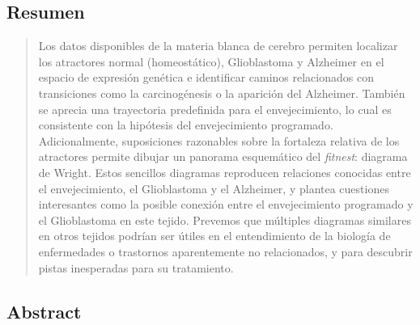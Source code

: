 \vfill

\begin{center}
\section*{Resumen}
\end{center}
\medskip

\begin{minipage}[c]{.9\linewidth}
\begin{quote}
	
{\large Los datos disponibles de la materia blanca de cerebro permiten localizar los atractores normal (homeostático), Glioblastoma y Alzheimer en el espacio de expresión genética e identificar caminos relacionados con transiciones como la carcinogénesis o la aparición del Alzheimer. También se aprecia una trayectoria predefinida para el envejecimiento, lo cual es consistente con la hipótesis del envejecimiento programado. Adicionalmente, suposiciones razonables sobre la fortaleza relativa de los atractores permite dibujar un panorama esquemático del \textit{fitnest}: diagrama de Wright. Estos sencillos diagramas reproducen relaciones conocidas entre el envejecimiento, el Glioblastoma y el Alzheimer, y plantea cuestiones interesantes como la posible conexión entre el envejecimiento programado y el Glioblastoma en este tejido. Prevemos que múltiples diagramas similares en otros tejidos podrían ser útiles en el entendimiento de la biología de enfermedades o trastornos aparentemente no relacionados, y para descubrir pistas inesperadas para su tratamiento.}




\end{quote}
\end{minipage}

\smallskip
\vfill
\cleardoublepage

\begin{center}
\section*{Abstract}
\end{center}
\medskip

